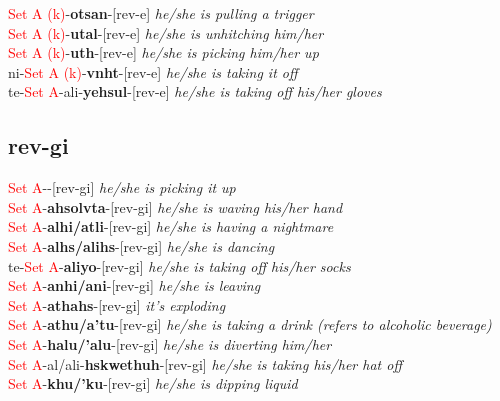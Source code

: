 \documentclass[oneside,openany]{book}%
\begin{document}
\textcolor{Red}{Set A (k)}{-}\textbf{otsan}{-}[rev-e] \textit{ he/she is pulling a trigger} \\%
\textcolor{Red}{Set A (k)}{-}\textbf{utal}{-}[rev-e] \textit{ he/she is unhitching him/her} \\%
\textcolor{Red}{Set A (k)}{-}\textbf{uth}{-}[rev-e] \textit{ he/she is picking him/her up} \\%
ni{-}\textcolor{Red}{Set A (k)}{-}\textbf{vnht}{-}[rev-e] \textit{ he/she is taking it off} \\%
te{-}\textcolor{Red}{Set A}{-}ali{-}\textbf{yehsul}{-}[rev-e] \textit{ he/she is taking off his/her gloves} \\%
\vspace{1em}%
\needspace{1in}%
\subsection*{rev-gi}%
\textcolor{Red}{Set A}{-}\textbf{}{-}[rev-gi] \textit{ he/she is picking it up} \\%
\textcolor{Red}{Set A}{-}\textbf{ahsolvta}{-}[rev-gi] \textit{ he/she is waving his/her hand} \\%
\textcolor{Red}{Set A}{-}\textbf{alhi/atli}{-}[rev-gi] \textit{ he/she is having a nightmare} \\%
\textcolor{Red}{Set A}{-}\textbf{alhs/alihs}{-}[rev-gi] \textit{ he/she is dancing} \\%
te{-}\textcolor{Red}{Set A}{-}\textbf{aliyo}{-}[rev-gi] \textit{ he/she is taking off his/her socks} \\%
\textcolor{Red}{Set A}{-}\textbf{anhi/ani}{-}[rev-gi] \textit{ he/she is leaving} \\%
\textcolor{Red}{Set A}{-}\textbf{athahs}{-}[rev-gi] \textit{ it's exploding} \\%
\textcolor{Red}{Set A}{-}\textbf{athu/a'tu}{-}[rev-gi] \textit{ he/she is taking a drink (refers to alcoholic beverage)} \\%
\textcolor{Red}{Set A}{-}\textbf{halu/'alu}{-}[rev-gi] \textit{ he/she is diverting him/her} \\%
\textcolor{Red}{Set A}{-}al/ali{-}\textbf{hskwethuh}{-}[rev-gi] \textit{ he/she is taking his/her hat off} \\%
\textcolor{Red}{Set A}{-}\textbf{khu/'ku}{-}[rev-gi] \textit{ he/she is dipping liquid} \\%
\end{document}
